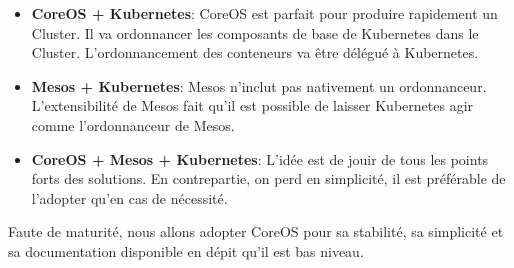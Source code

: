 \begin{itemize}
	\item \textbf{CoreOS + Kubernetes}: CoreOS est parfait pour produire rapidement un Cluster. Il va ordonnancer les composants de base de Kubernetes dans le Cluster. L'ordonnancement des conteneurs va être délégué à Kubernetes.
	\item \textbf{Mesos + Kubernetes}: Mesos n'inclut pas nativement un ordonnanceur. L'extensibilité de Mesos fait qu'il est possible de laisser Kubernetes agir comme l'ordonnanceur de Mesos.
	\item \textbf{CoreOS + Mesos + Kubernetes}: L'idée est de jouir de tous les points forts des solutions. En contrepartie, on perd en simplicité, il est préférable de l'adopter qu'en cas de nécessité.
\end{itemize}

Faute de maturité, nous allons adopter CoreOS pour sa stabilité, sa simplicité et sa documentation disponible en dépit qu'il est bas niveau.